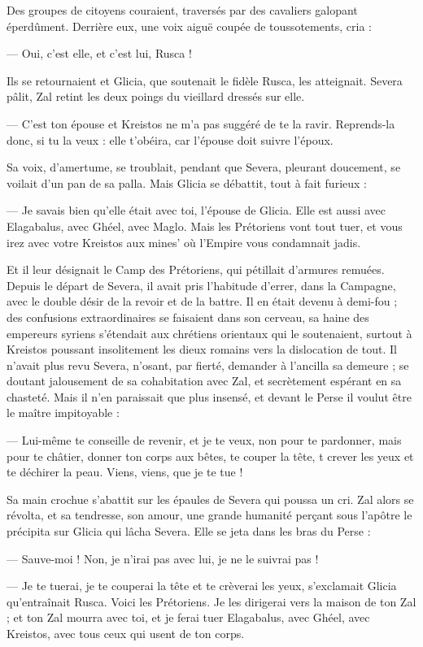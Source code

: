 \documentclass[a4paper, 11pt, oneside, polutonikogreek, french]{article}
\begin{document}
Des groupes de citoyens couraient, traversés par des cavaliers galopant éperdûment. Derrière eux, une voix aiguë coupée de toussotements, cria :

--- Oui, c'est elle, et c'est lui, Rusca !

Ils se retournaient et Glicia, que soutenait le fidèle Rusca, les atteignait. Severa pâlit, Zal retint les deux poings du vieillard dressés sur elle.

--- C'est ton épouse et Kreistos ne m'a pas suggéré de te la ravir. Reprends-la donc, si tu la veux : elle t'obéira, car l'épouse doit suivre l'époux.

Sa voix, d'amertume, se troublait, pendant que Severa, pleurant doucement, se voilait d'un pan de sa palla. Mais Glicia se débattit, tout à fait furieux :

--- Je savais bien qu'elle était avec toi, l'épouse de Glicia. Elle est aussi avec Elagabalus, avec Ghéel, avec Maglo. Mais les Prétoriens vont tout tuer, et vous irez avec votre Kreistos aux mines' où l'Empire vous condamnait jadis.

Et il leur désignait le Camp des Prétoriens, qui pétillait d'armures remuées. Depuis le départ de Severa, il avait pris l'habitude d'errer, dans la Campagne, avec le double désir de la revoir et de la battre. Il en était devenu à demi-fou ; des confusions extraordinaires se faisaient dans son cerveau, sa haine des empereurs syriens s'étendait aux chrétiens orientaux qui le soutenaient, surtout à Kreistos poussant insolitement les dieux romains vers la dislocation de tout. Il n'avait plus revu Severa, n'osant, par fierté, demander à l'ancilla sa demeure ; se doutant jalousement de sa cohabitation avec Zal, et secrètement espérant en sa chasteté. Mais il n'en paraissait que plus insensé, et devant le Perse il voulut être le maître impitoyable :

--- Lui-même te conseille de revenir, et je te veux, non pour te pardonner, mais pour te châtier, donner ton corps aux bêtes, te couper la tête, t crever les yeux et te déchirer la peau. Viens, viens, que je te tue !

Sa main crochue s'abattit sur les épaules de Severa qui poussa un cri. Zal alors se révolta, et sa tendresse, son amour, une grande humanité perçant sous l'apôtre le précipita sur Glicia qui lâcha Severa. Elle se jeta dans les bras du Perse :

--- Sauve-moi ! Non, je n'irai pas avec lui, je ne le suivrai pas !

--- Je te tuerai, je te couperai la tête et te crèverai les yeux, s'exclamait Glicia qu'entraînait Rusca. Voici les Prétoriens. Je les dirigerai vers la maison de ton Zal ; et ton Zal mourra avec toi, et je ferai tuer Elagabalus, avec Ghéel, avec Kreistos, avec tous ceux qui usent de ton corps.
\end{document}
